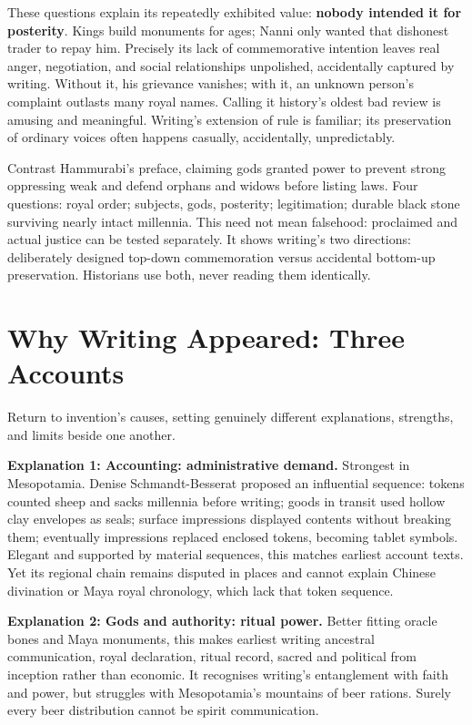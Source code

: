 These questions explain its repeatedly exhibited value: \textbf{nobody intended it for posterity}. Kings build monuments for ages; Nanni only wanted that dishonest trader to repay him. Precisely its lack of commemorative intention leaves real anger, negotiation, and social relationships unpolished, accidentally captured by writing. Without it, his grievance vanishes; with it, an unknown person's complaint outlasts many royal names. Calling it history's oldest bad review is amusing and meaningful. Writing's extension of rule is familiar; its preservation of ordinary voices often happens casually, accidentally, unpredictably.

Contrast Hammurabi's preface, claiming gods granted power to prevent strong oppressing weak and defend orphans and widows before listing laws. Four questions: royal order; subjects, gods, posterity; legitimation; durable black stone surviving nearly intact millennia. This need not mean falsehood: proclaimed and actual justice can be tested separately. It shows writing's two directions: deliberately designed top-down commemoration versus accidental bottom-up preservation. Historians use both, never reading them identically.

\section{Why Writing Appeared: Three Accounts}
Return to invention's causes, setting genuinely different explanations, strengths, and limits beside one another.

\textbf{Explanation 1: Accounting: administrative demand.} Strongest in Mesopotamia. Denise Schmandt-Besserat proposed an influential sequence: tokens counted sheep and sacks millennia before writing; goods in transit used hollow clay envelopes as seals; surface impressions displayed contents without breaking them; eventually impressions replaced enclosed tokens, becoming tablet symbols. Elegant and supported by material sequences, this matches earliest account texts. Yet its regional chain remains disputed in places and cannot explain Chinese divination or Maya royal chronology, which lack that token sequence.

\textbf{Explanation 2: Gods and authority: ritual power.} Better fitting oracle bones and Maya monuments, this makes earliest writing ancestral communication, royal declaration, ritual record, sacred and political from inception rather than economic. It recognises writing's entanglement with faith and power, but struggles with Mesopotamia's mountains of beer rations. Surely every beer distribution cannot be spirit communication.

